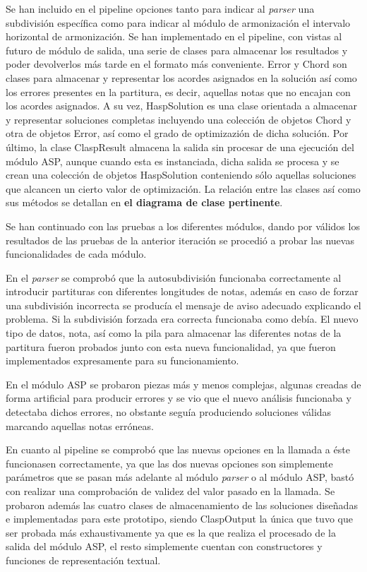 Se han incluido en el pipeline opciones tanto para indicar al \textit{parser} una subdivisión específica como para indicar al módulo de armonización el intervalo horizontal de armonización. Se han implementado en el pipeline, con vistas al futuro de módulo de salida, una serie de clases para almacenar los resultados y poder devolverlos más tarde en el formato más conveniente. Error y Chord son clases para almacenar y representar los acordes asignados en la solución así como los errores presentes en la partitura, es decir, aquellas notas que no encajan con los acordes asignados. A su vez, HaspSolution es una clase orientada a almacenar y representar soluciones completas incluyendo una colección de objetos Chord y otra de objetos Error, así como el grado de optimizazión de dicha solución. Por último, la clase ClaspResult almacena la salida sin procesar de una ejecución del módulo ASP, aunque cuando esta es instanciada, dicha salida se procesa y se crean una colección de objetos HaspSolution conteniendo sólo aquellas soluciones que alcancen un cierto valor de optimización. La relación entre las clases así como sus métodos se detallan en \textbf{el diagrama de clase pertinente}.

Se han continuado con las pruebas a los diferentes módulos, dando por válidos los resultados de las pruebas de la anterior iteración se procedió a probar las nuevas funcionalidades de cada módulo.

En el \textit{parser} se comprobó que la autosubdivisión funcionaba correctamente al introducir partituras con diferentes longitudes de notas, además en caso de forzar una subdivisión incorrecta se producía el mensaje de aviso adecuado explicando el problema. Si la subdivisión forzada era correcta funcionaba como debía. El nuevo tipo de datos, nota, así como la pila para almacenar las diferentes notas de la partitura fueron probados junto con esta nueva funcionalidad, ya que fueron implementados expresamente para su funcionamiento.

En el módulo ASP se probaron piezas más y menos complejas, algunas creadas de forma artificial para producir errores y se vio que el nuevo análisis funcionaba y detectaba dichos errores, no obstante seguía produciendo soluciones válidas marcando aquellas notas erróneas.

En cuanto al pipeline se comprobó que las nuevas opciones en la llamada a éste funcionasen correctamente, ya que las dos nuevas opciones son simplemente parámetros que se pasan más adelante al módulo \textit{parser} o al módulo ASP, bastó con realizar una comprobación de validez del valor pasado en la llamada. Se probaron además las cuatro clases de almacenamiento de las soluciones diseñadas e implementadas para este prototipo, siendo ClaspOutput la única que tuvo que ser probada más exhaustivamente ya que es la que realiza el procesado de la salida del módulo ASP, el resto simplemente cuentan con constructores y funciones de representación textual. 


